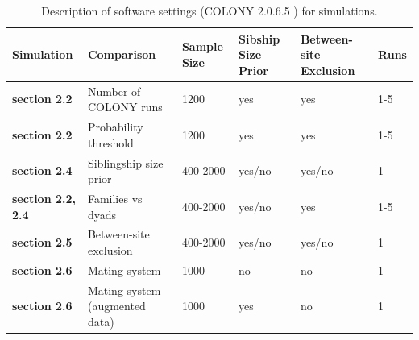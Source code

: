 \documentclass[12pt]{article}
\begin{document}
\begin{table}[H]
\centering
\caption{Description of software settings (COLONY 2.0.6.5 \parencite{jonesCOLONYProgramParentage2010}) for simulations.}
\label{tab:softwarespecs}
\footnotesize
\begin{tabular}{ p{2cm}  p{3.5cm} p{2cm} p{2.5cm} p{2cm} p{1.5cm}}
\hline
\textbf{Simulation}& \textbf{Comparison}&\textbf{Sample Size}& \textbf{Sibship Size Prior}& \textbf{Between-site Exclusion}& \textbf{Runs}\\
\hline
\textbf{section 2.2} & Number of COLONY runs& 1200 & yes& yes& 1-5\\
\hline
\textbf{section 2.2} & Probability threshold& 1200 & yes & yes & 1-5\\
\hline
\textbf{section 2.4} & Siblingship size prior & 400-2000 & yes/no & yes/no& 1\\
\hline
\textbf{section 2.2, 2.4} & Families vs dyads & 400-2000 & yes/no & yes& 1-5\\
\hline
\textbf{section 2.5} & Between-site exclusion & 400-2000 & yes/no & yes/no& 1\\
\hline
\textbf{section 2.6} & Mating system& 1000 & no & no& 1\\
   \hline  
\textbf{section 2.6} & Mating system (augmented data)& 1000 & yes & no& 1 \\
   \hline  
\end{tabular}
\end{table}
\end{document}
